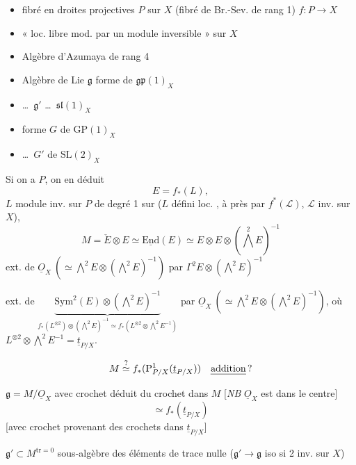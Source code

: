 \documentclass[11pt,a4paper]{article}
\begin{document}
\begin{itemize}
\item[a)] fibré en droites projectives $P$ sur $X$ (fibré de Br.-Sev. de rang 1) \quad $f : P \to X$
\item[b)] « \struck{\ill{}}  loc. libre  mod.  par un module inversible » sur $X$
\item[c)] Algèbre d'Azumaya  de rang 4
\item[d)] Algèbre de Lie $\mathfrak{g}$ forme  de $\mathfrak{gp}(1)_X$
\item[d')] \ldots\ $\mathfrak{g}'$ \ldots\ $\mathfrak{sl}(1)_X$
\item[e)] forme $G$ de $\mathrm{GP}(1)_X$
\item[e')] \ldots\ $G'$ de $\mathrm{SL}(2)_X$
\end{itemize}

Si on a $P$, on en déduit
\[
E = f_*(L),
\]
$L$ module inv. sur $P$ de degré 1 sur  ($L$ défini loc. , à  près par $f^*(\mathcal{L})$, $\mathcal{L}$ inv. sur $X$),
\[
M = \check{E}\otimes E \simeq \underline{\mathrm{End}}(E) \simeq E\otimes E\otimes(\textstyle\bigwedge^2 E)^{-1}
\]
ext. de $\underline{O}_X\ (\simeq \bigwedge^2E\otimes(\bigwedge^2E)^{-1})$ par $\Gamma^2E\otimes(\bigwedge^2E)^{-1}$

ext. de $\underbrace{\mathrm{Sym}^2(E)\otimes(\bigwedge^2E)^{-1}}_{f_*(L^{\otimes 2})\otimes(\bigwedge^2E)^{-1} \simeq f_*(L^{\otimes 2}\otimes\bigwedge^2E^{-1})}$ par $\underline{O}_X\ (\simeq \bigwedge^2E\otimes(\bigwedge^2E)^{-1})$, où $L^{\otimes 2}\otimes\bigwedge^2E^{-1} = \underline{t}_{P/X}$.

\[
M \overset{?}{\simeq} f_*(\mathrm{P}^1_{P/X}(\underline{t}_{P/X}))\quad \text{\uncertain{addition}\,?}
\]

$\mathfrak{g} = M/\underline{O}_X$ avec crochet déduit du crochet  dans $M$ [\emph{NB} $\underline{O}_X$ est dans le centre]
\[
\simeq f_*(\underline{t}_{P/X})
\]
[avec crochet provenant des crochets dans $\underline{t}_{P/X}$]

$\mathfrak{g}' \subset M^{\mathrm{tr}=0}$ sous-algèbre des éléments de trace nulle ($\mathfrak{g}' \to \mathfrak{g}$ iso si 2 inv. sur $X$)
\end{document}
